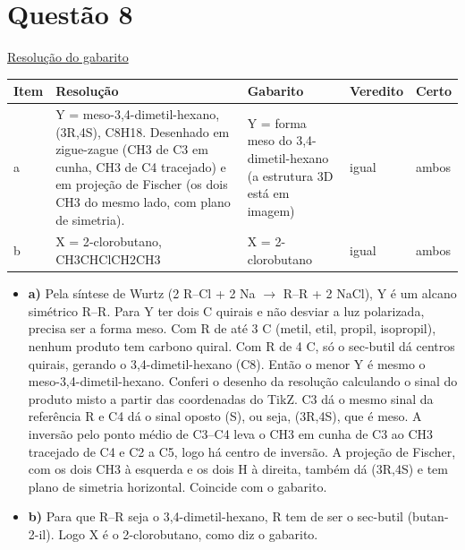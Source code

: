 \documentclass{article}%
\begin{document}
\section*{Questão 8}%
\href{https://poliedroresolve.sistemapoliedro.com.br/vestibulares/ime/2027/ime-2-fase-dia-3-28-10-2026-2-fase-dia-3/dissertativa-8-quimica-2-fase-dia-3-ime-2027}{Resolução do gabarito}\par\smallskip%
\begin{longtable}{@{}p{} p{} p{} p{} p{}@{}}\toprule Item & Resolução & Gabarito & Veredito & Certo \\ \midrule
a & Y = meso{-}3,4{-}dimetil{-}hexano, (3R,4S), C8H18. Desenhado em zigue{-}zague (CH3 de C3 em cunha, CH3 de C4 tracejado) e em projeção de Fischer (os dois CH3 do mesmo lado, com plano de simetria). & Y = forma meso do 3,4{-}dimetil{-}hexano (a estrutura 3D está em imagem) & igual & ambos \\
b & X = 2{-}clorobutano, CH3CHClCH2CH3 & X = 2{-}clorobutano & igual & ambos \\
\bottomrule\end{longtable}%
\begin{itemize}%
\item%
\textbf{a)} Pela síntese de Wurtz (2 R--Cl + 2 Na $\to$ R--R + 2 NaCl), Y é um alcano simétrico R--R. Para Y ter dois C quirais e não desviar a luz polarizada, precisa ser a forma meso. Com R de até 3 C (metil, etil, propil, isopropil), nenhum produto tem carbono quiral. Com R de 4 C, só o sec{-}butil dá centros quirais, gerando o 3,4{-}dimetil{-}hexano (C8). Então o menor Y é mesmo o meso{-}3,4{-}dimetil{-}hexano. Conferi o desenho da resolução calculando o sinal do produto misto a partir das coordenadas do TikZ. C3 dá o mesmo sinal da referência R e C4 dá o sinal oposto (S), ou seja, (3R,4S), que é meso. A inversão pelo ponto médio de C3--C4 leva o CH3 em cunha de C3 ao CH3 tracejado de C4 e C2 a C5, logo há centro de inversão. A projeção de Fischer, com os dois CH3 à esquerda e os dois H à direita, também dá (3R,4S) e tem plano de simetria horizontal. Coincide com o gabarito.%
\item%
\textbf{b)} Para que R--R seja o 3,4{-}dimetil{-}hexano, R tem de ser o sec{-}butil (butan{-}2{-}il). Logo X é o 2{-}clorobutano, como diz o gabarito.%
\end{itemize}%
\end{document}
